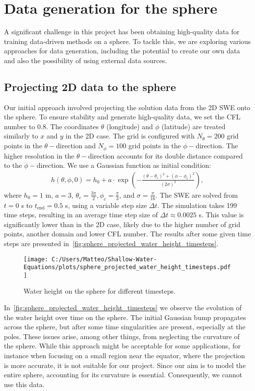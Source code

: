 \section{Data generation for the sphere}\label{sec:data_generation_sphere}
A significant challenge in this project has been obtaining high-quality data for training data-driven methods on a sphere.
To tackle this, we are exploring various approaches for data generation, including the potential to create our own data and also the possibility of using external data sources.

\subsection*{Projecting 2D data to the sphere}
Our initial approach involved projecting the solution data from the 2D SWE onto the sphere.
To ensure stability and generate high-quality data, we set the CFL number to 0.8.
The coordinates $\theta$ (longitude) and $\phi$ (latitude) are treated similarly to $x$ and $y$ in the 2D case.
The grid is configured with $N_{\theta} = 200$ grid points in the $\theta-$direction and $N_{\phi} = 100$ grid points in the $\phi-$direction.
The higher resolution in the $\theta-$direction accounts for its double distance compared to the $\phi-$direction.
We use a Gaussian function as initial condition:
\begin{align*}
    h(\theta, \phi, 0) = h_0 + a \cdot \exp\left( -\frac{{(\theta - \theta_c)}^2 + {(\phi - \phi_c)}^2}{{(2\sigma)}^2} \right),
\end{align*}
where $h_0 = 1$ m, $a = 3$, $\theta_c = \frac{3 \pi}{2}, \phi_c = \frac{\pi}{3}$, and $\sigma = \frac{\pi}{16}$.
The SWE are solved from $t = 0$ s to $t_{\text{end}} = 0.5$ s, using a variable step size $\Delta t$.
The simulation takes 199 time steps, resulting in an average time step size of $\Delta t \approx 0.0025$ s.
This value is significantly lower than in the 2D case, likely due to the higher number of grid points, another domain and lower CFL number.
The results after some given time steps are presented in~\autoref{fig:sphere_projected_water_height_timesteps}.
\begin{figure}[H]
    \centering
    \texttt{[image: C:/Users/Matteo/Shallow-Water-Equations/plots/sphere\_projected\_water\_height\_timesteps.pdf]}
    \caption{Water height on the sphere for different timesteps.}\label{fig:sphere_projected_water_height_timesteps}
\end{figure}
In~\autoref{fig:sphere_projected_water_height_timesteps} we observe the evolution of the water height over time on the sphere.
The initial Gaussian bump propagates across the sphere, but after some time singularities are present, especially at the poles.
These issues arise, among other things, from neglecting the curvature of the sphere. 
While this approach might be acceptable for some applications, for instance when focusing on a small region near the equator, where the projection is more accurate, it is not suitable for our project.
Since our aim is to model the entire sphere, accounting for its curvature is essential.
Consequently, we cannot use this data.

